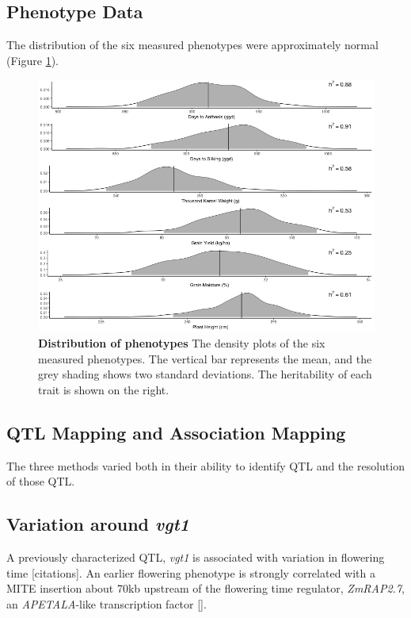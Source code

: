 \documentclass[article,9pt,twocolumn,twoside]{rilabRxiv}
\begin{document}
\subsection{Phenotype Data}
The distribution of the six measured phenotypes were approximately normal (Figure \ref{fig:figure2}).

\begin{figure}[ht]
\centering
\includegraphics[width=\linewidth]{figures/Methods_Fig2.png}
\caption{\textbf{Distribution of phenotypes} The density plots of the six measured phenotypes. The vertical bar represents the mean, and the grey shading shows two standard deviations. The heritability of each trait is shown on the right.}
\label{fig:figure2}
\end{figure}

\subsection{QTL Mapping and Association Mapping}
The three methods varied both in their ability to identify QTL and the resolution of those QTL.
\subsection{Variation around \emph{vgt1}}
A previously characterized QTL, \emph{vgt1} is associated with variation in flowering time [citations]. An earlier flowering phenotype is strongly correlated with a MITE insertion about 70kb upstream of the flowering time regulator, \emph{ZmRAP2.7}, an \emph{APETALA}-like transcription factor [].
\end{document}
